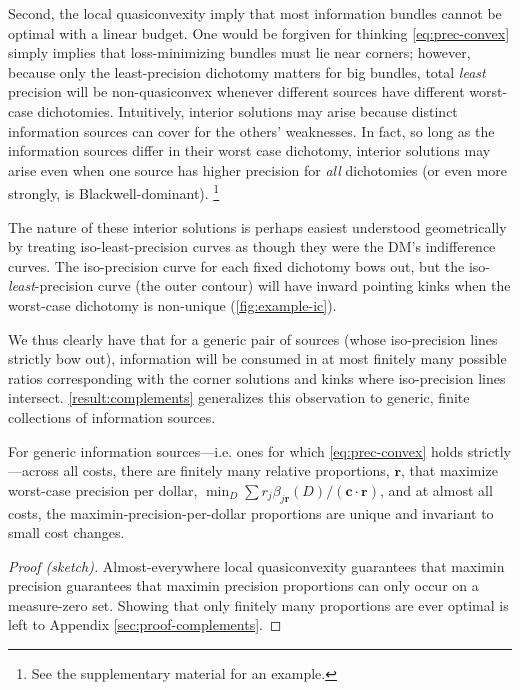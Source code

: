 \documentclass{fancyArticle}
\renewcommand{\|}{\,|\,}                    %
\providecommand{\;}{\,;}                    %
\begin{document}
Second, the local quasiconvexity imply that most information bundles cannot be optimal with a linear budget.
One would be forgiven for thinking \ref{eq:prec-convex} simply implies that loss-minimizing bundles must lie near corners; however, because only the least-precision dichotomy matters for big bundles, total \textit{least} precision will be non-quasiconvex whenever different sources have different worst-case dichotomies.
Intuitively, interior solutions may arise because distinct information sources can cover for the others' weaknesses.
In fact, so long as the information sources differ in their worst case dichotomy, interior solutions may arise even when one source has higher precision for \textit{all} dichotomies (or even more strongly, is Blackwell-dominant).%
\footnote{See the supplementary material for an example.}

The nature of these interior solutions is perhaps easiest understood geometrically by treating iso-least-precision curves as though they were the DM's indifference curves.
The iso-precision curve for each fixed dichotomy bows out, but the iso-\textit{least}-precision curve (the outer contour) will have inward pointing kinks when the worst-case dichotomy is non-unique (\autoref{fig:example-ic}).

We thus clearly have that for a generic pair of sources (whose iso-precision lines strictly bow out), information will be consumed in at most finitely many possible ratios corresponding with the corner solutions and kinks where iso-precision lines intersect.
\autoref{result:complements} generalizes this observation to generic, finite collections of information sources.

\begin{proposition}\label{result:complements}
  For generic information sources---i.e. ones for which \ref{eq:prec-convex} holds strictly---across all costs, there are finitely many relative proportions, $\mathbf{r}$, that maximize worst-case precision per dollar, $\min_{D}\sum r_j\beta_{j \mathbf{r}}(D)/(\mathbf{c} \cdot \mathbf{r})$, and at almost all costs, the maximin-precision-per-dollar proportions are unique and invariant to small cost changes.
\end{proposition}
\begin{proof}[Proof (sketch)]
  Almost-everywhere local quasiconvexity guarantees that maximin precision guarantees that maximin precision proportions can only occur on a measure-zero set.
  Showing that only finitely many proportions are ever optimal is left to Appendix \ref{sec:proof-complements}.
  \renewcommand{\qedsymbol}{}
\end{proof}
\end{document}
